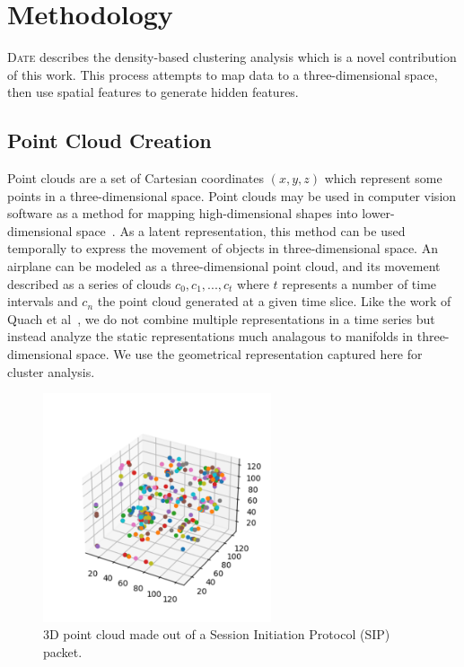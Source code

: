 \section{Methodology}

\textsc{Date} describes the density-based clustering analysis which is a novel contribution of this work. This process attempts to map data to a three-dimensional space, then use spatial features to generate hidden features.

\subsection{Point Cloud Creation}
Point clouds are a set of Cartesian coordinates $(x, y, z)$ which represent some points in a three-dimensional space. Point clouds may be used in computer vision software as a method for mapping high-dimensional shapes into lower-dimensional space~\cite{Wang_2019_ICCV}. As a latent representation, this method can be used temporally to express the movement of objects in three-dimensional space. An airplane can be modeled as a three-dimensional point cloud, and its movement described as a series of clouds ${c_0, c_1,...,c_t}$ where $t$ represents a number of time intervals and $c_n$ the point cloud generated at a given time slice. Like the work of Quach et al~\cite{Quach2020compression}, we do not combine multiple representations in a time series but instead analyze the static representations much analagous to manifolds in three-dimensional space. We use the geometrical representation captured here for cluster analysis.

\begin{figure} [ht!]
\centering
\includegraphics[width=0.6\textwidth]{chapters/6/img/sipcloud.png}
\caption{3D point cloud made out of a Session Initiation Protocol (SIP) packet.}
\label{fig:cloud}
\end{figure}

